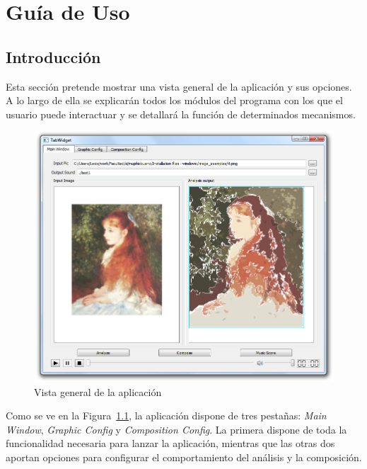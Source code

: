\chapter{Guía de Uso}
\label{chap:guiauso}


	\section{Introducción}
		
		Esta sección pretende mostrar una vista general de la aplicación y sus opciones. A lo largo de ella se explicarán todos los módulos del programa con los que el usuario puede interactuar y se detallará la función de determinados mecanismos.\\
		
		\begin{figure}[htbp]
		\centering
		\hspace*{-0.3in}
		\includegraphics[scale=0.40]{graphics/interfazoverview.png}
		\caption{Vista general de la aplicación}
		\label{fig:interfazoverview}
		\end{figure}
		
		Como se ve en la Figura~\ref{fig:interfazoverview}, la aplicación dispone de tres pestañas: \emph{Main Window}, \emph{Graphic Config} y \emph{Composition Config}. La primera dispone de toda la funcionalidad necesaria para lanzar la aplicación, mientras que las otras dos aportan opciones para configurar el comportamiento del análisis y la composición.\\
		
